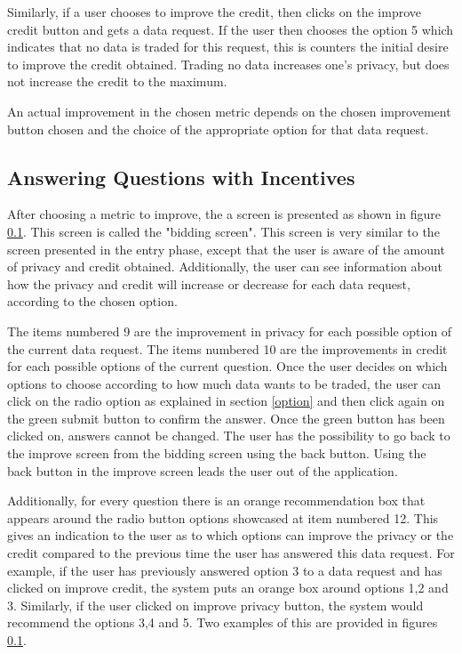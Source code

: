 Similarly, if a user chooses to improve the credit, then clicks on the improve credit button and gets a data request. If the user then chooses the option
5 which indicates that no data is traded for this request, this is counters the initial desire to improve the credit obtained. Trading no data increases one's privacy, but does not increase the credit to the maximum.

An actual improvement in the chosen metric depends on the chosen improvement button chosen and the choice of the appropriate option for that data request.


\subsection{Answering Questions with Incentives}

After choosing a metric to improve, the a screen is presented as shown in figure \ref{}.
This screen is called the "bidding screen". This screen is very similar to the screen presented in the entry phase, except that the user
is aware of the amount of privacy and credit obtained. Additionally, the user can see information about how the privacy and credit will increase or decrease for each data request, according to the chosen option.

The items numbered 9 are the improvement in privacy for each possible option of the current data request. The items numbered 10 are the improvements in credit for each possible options of the current question. Once the user decides on which options to choose according to how much data wants to be traded, the user can click on the radio option as explained in section \ref{option} and then click again on the green submit button to confirm the answer. Once the green button has been clicked on, answers cannot be changed. The user has the possibility to go back to the improve screen from the bidding screen using the back button. Using the back button in the improve screen leads the user out of the application.

Additionally, for every question there is an orange recommendation box that appears around the radio button options showcased at item numbered 12.
This gives an indication to the user as to which options can improve the privacy or the credit compared to the previous time the user has
answered this data request. For example, if the user has previously answered option 3 to a data request and has clicked on improve credit, the system
puts an orange box around options 1,2 and 3. Similarly, if the user clicked on improve privacy button, the system would recommend the options 3,4 and 5. Two examples of this are provided in figures \ref{}.



